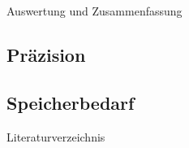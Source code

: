 \documentclass[9pt, t]{beamer}
\begin{document}
\begin{frame}{Auswertung und Zusammenfassung}

\end{frame}

\subsection{Präzision}

\subsection{Speicherbedarf}

\begin{frame}{Literaturverzeichnis}
    \printbibliography
\end{frame}
\end{document}
